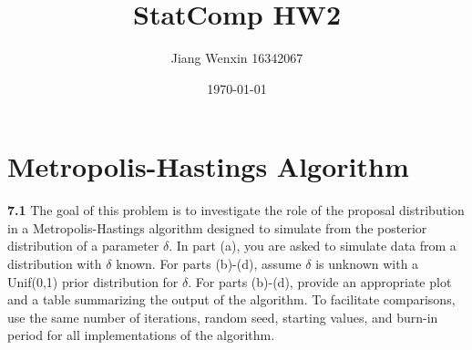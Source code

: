 \documentclass[11pt]{article}
\title{\vspace{-2em}\textbf{StatComp HW2}}
\author{Jiang Wenxin 16342067}
\date{\today}
\begin{document}
\maketitle
\tableofcontents
\section{Metropolis-Hastings Algorithm}
\textbf{7.1} The goal of this problem is to investigate the role of the proposal distribution in a Metropolis-Hastings algorithm designed to simulate from the posterior distribution of a parameter $\delta .$ In part (a), you are asked to simulate data from a distribution with $\delta$ known. For parts (b)-(d), assume $\delta$ is unknown with a Unif(0,1) prior distribution for $\delta$. For parts (b)-(d), provide an appropriate plot and a table summarizing the output of the algorithm. To facilitate comparisons, use the same number of iterations, random seed, starting values, and burn-in period for all implementations of the algorithm.
\end{document}
